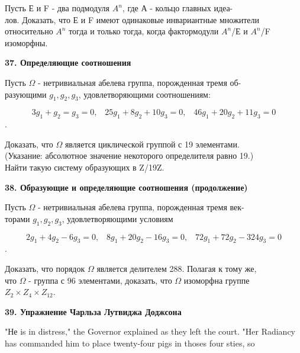 \documentclass{../template/mai_book}
\begin{document}
\medskip

Пусть Е и F - два подмодуля $A^n$, где А - кольцо главных 
идеа-\\лов. Доказать, что Е и F имеют одинаковые инвариантные множители 
относительно $A^n$ тогда и только тогда, когда фактормодули $A^n$/Е и 
$A^n$/F изоморфны. 

\medskip

{\noindent\bf37. Определяющие соотношения }

\medskip

Пусть $\Omega$ - нетривиальная абелева группа, порожденная тремя
об-\\разующими $g_1,g_2,g_3$, удовлетворяющими соотношениям: 


$$ 3g_1+g_2=g_3=0,\;\;\; 25g_1+8g_2+10g_3=0,\;\;\;46g_1+20g_2+11g_3=0 $$. 


Доказать, что $\Omega$ является циклической группой с 19 элементами.\\ 
(Указание: абсолютное значение некоторого определителя равно 19.)\\ 
Найти такую систему образующих в Z/19Z. 

\medskip

{\noindent\bf38. Образующие и определяющие соотношения (продолжение) }

\medskip

Пусть $\Omega$ - нетривиальная абелева группа, порожденная тремя
век-\\торами $g_1,g_2,g_3$, удовлетворяющими условиям 


$$ 2g_1+4g_2-6g_3=0,\;\;\; 8g_1+20g_2-16g_3=0,\;\;\;72g_1+72g_2-324g_3=0 $$. 


Доказать, что порядок $\Omega$ является делителем 288. Полагая к тому же, \\
что $\Omega$ - группа с 96 элементами, доказать, что $\Omega$ изоморфна группе\\ 
$Z_2\times Z_4\times Z_12 $. 

\medskip

{\noindent\bf39. Упражнение Чарльза Лутвиджа Доджсона }

\medskip

"Не is in distress," the Governor explained as they left the court. "Her 
Radiancy has commanded him to place twenty-four pigs in thoses four sties, so
\end{document}
